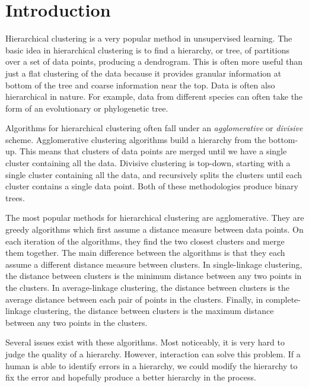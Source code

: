 \documentclass[12pt]{article}
\begin{document}
\maketitle

\section{Introduction}
Hierarchical clustering is a very popular method in unsupervised learning.
The basic idea in hierarchical clustering is to find a hierarchy, or tree,  of partitions
over a set of data points, producing a dendrogram.
This is often more useful than just a flat clustering of the data because
it provides granular information at bottom of the tree and coarse
information near the top. Data is often also hierarchical in nature. 
For example, data from different
species can often take the form of an evolutionary or phylogenetic tree.

Algorithms for hierarchical clustering often fall under an \emph{agglomerative}
or \emph{divisive} scheme. Agglomerative clustering algorithms
build a hierarchy from the bottom-up. This means that clusters of data
points are merged until we have a single cluster containing all the data.
Divisive clustering is top-down, starting with a single cluster
containing all the data, and recursively splits the clusters
until each cluster contains a single data point. Both of these methodologies
produce binary trees.

The most popular methods for hierarchical clustering are agglomerative.
They are greedy algorithms which first assume a distance measure
between data points.
On each iteration of the algorithms, they find the two closest clusters
and merge them together.
The main difference between the algorithms
is that they each assume a different distance measure between clusters.
In single-linkage clustering, the distance between clusters is the 
minimum distance between any two points in the clusters.
In average-linkage clustering, the distance between clusters is the
average distance between each pair of points in the clusters.
Finally, in complete-linkage clustering, the distance between clusters
is the maximum distance between any two points in the clusters.

Several issues exist with these algorithms. Most noticeably, it is very hard
to judge the quality of a hierarchy. However, interaction can solve this problem.
If a human is able to identify errors in a hierarchy, we could modify the hierarchy
to fix the error and hopefully produce a better hierarchy in the process.
\end{document}
